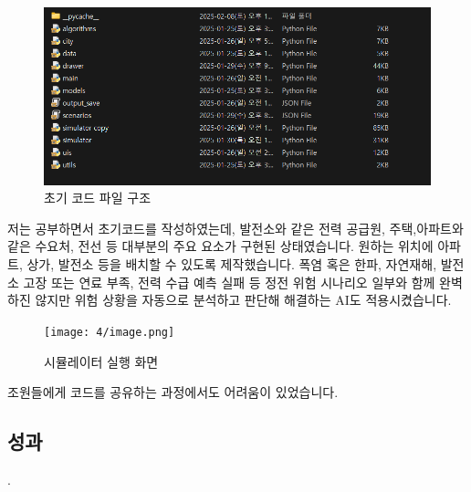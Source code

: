 \begin{figure}[h]
    \includegraphics[width=\columnwidth]{4/image10.png}
    \caption{초기 코드 파일 구조}
\end{figure}
저는 공부하면서 초기코드를 작성하였는데, 발전소와 같은 전력 공급원, 주택,아파트와 같은 수요처, 전선  등 대부분의 주요 요소가 구현된 상태였습니다. 원하는 위치에 아파트, 상가, 발전소 등을 배치할 수 있도록 제작했습니다. 폭염 혹은 한파, 자연재해, 발전소 고장 또는 연료 부족, 전력 수급 예측 실패 등 정전 위험 시나리오 일부와 함께 완벽하진 않지만 위험 상황을 자동으로 분석하고 판단해 해결하는 AI도 적용시켰습니다. 
\begin{figure}[h]
    \texttt{[image: 4/image.png]}
    \caption{시뮬레이터 실행 화면}
\end{figure}
    \label{fig:fsm}
    조원들에게 코드를 공유하는 과정에서도 어려움이 있었습니다.
\subsection{성과}
.

